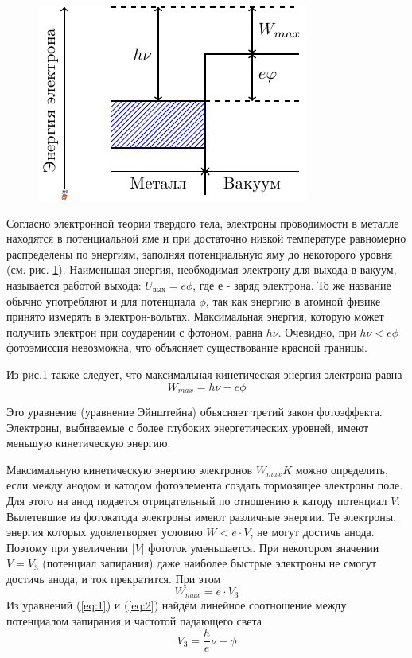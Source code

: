 \begin{figure}[h]
	\centering
	\includegraphics[]{fig/fig1}
	\caption{}
	\label{fig:1}
\end{figure}
Согласно электронной теории твердого тела, электроны проводимости в металле находятся в потенциальной яме и при достаточно низкой температуре равномерно распределены по энергиям, заполняя потенциальную яму до некоторого уровня (см. рис. \ref{fig:1}).
Наименьшая энергия, необходимая электрону для выхода в вакуум, называется работой выхода: $U_{\text{вых}} = e\phi$, где $е$ - заряд электрона. То же название обычно употребляют и для потенциала $\phi$, так как энергию в атомной физике принято измерять в электрон-вольтах. Максимальная энергия, которую может получить электрон при соударении с фотоном, равна $h \nu$. Очевидно, при $h \nu<e\phi$ фотоэмиссия невозможна, что объясняет существование красной границы.

Из рис.\ref{fig:1} также следует, что максимальная кинетическая энергия электрона равна
\begin{equation}
	\label{eq:1}
 	W_{max}=h \nu -e\phi
 \end{equation} 

Это уравнение (уравнение Эйнштейна) объясняет третий закон
фотоэффекта. Электроны, выбиваемые с более глубоких энергетических уровней, имеют меньшую кинетическую энергию.

Максимальную кинетическую энергию электронов $W_{max}K$ можно определить, если между анодом и катодом фотоэлемента создать тормозящее электроны поле. Для этого на анод подается отрицательный по отношению к катоду потенциал $V$. Вылетевшие из фотокатода электроны имеют различные энергии. Те электроны, энергия которых удовлетворяет условию $W < e\cdot V$, не могут достичь анода. Поэтому при увеличении $ |V|$ фототок уменьшается. При некотором значении $V = V_{3}$ (потенциал запирания) даже наиболее быстрые электроны не смогут достичь анода, и ток прекратится. При этом
\begin{equation}
	\label{eq:2}
	W_{max}=e\cdot V_{3}
\end{equation}
Из уравнений (\ref{eq:1}) и (\ref{eq:2}) найдём линейное соотношение между потенциалом запирания и частотой падающего света
\begin{equation}
	\label{eq:3}
	V_{3}=\frac he \nu-\phi
\end{equation}

